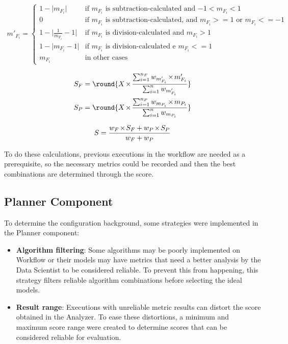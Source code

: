 \documentclass[10pt,conference]{IEEEtran}
\DeclarePairedDelimiter{\round}\lfloor\rceil
\let\oldtimes\times
\def\times{{\mkern1mu\oldtimes\mkern1mu}}
\begin{document}
\begin{gather}
\label{eqn:normalizationFairness}
	m'_{F_i} = 
	\begin{cases}
	1-\lvert m_{F_i} \rvert & \text{if $m_{F_i}$ is subtraction-calculated and $-1 < m_{F_i} < 1$}\\
	0 & \text{if $m_{F_i}$ is subtraction-calculated, and $m_{F_i} >= 1$ or $m_{F_i} <= -1$}\\
	1-\lvert \frac{1}{m_{F_i}}-1 \lvert & \text{if $m_{F_i}$ is division-calculated and $m_{F_i} > 1$}\\
	1-\lvert m_{F_i}-1 \lvert & \text{if $m_{F_i}$ is division-calculated e $m_{F_i} <= 1$}\\
	m_{F_i} & \text{in other cases}
	\end{cases}
\end{gather}

\begin{equation}
\label{eqn:groupScores}
	\begin{aligned}
	S_F = \round{X \times \frac{\sum_{i=1}^{n_F} w_{m'_{F_i}} \times m'_{F_i}}{\sum_{i=1}^{n} w_{m'_{F_i}}}}\\
	S_P = \round{X \times \frac{\sum_{i=1}^{n_P} w_{m_{P_i}} \times m_{P_i}}{\sum_{i=1}^{n} w_{m_{P_i}}}}
	\end{aligned}
\end{equation}

\begin{equation}
\label{eqn:totalScore}
	S = \frac{w_F \times S_F + w_P \times S_P}{w_F + w_P}
\end{equation}

To do these calculations, previous executions in the workflow are needed as a prerequisite, so the necessary metrics could be recorded and then the best combinations are determined through the score.

\subsection{Planner Component}

To determine the configuration background, some strategies were implemented in the Planner component:

\begin{itemize}
\item \textbf{Algorithm filtering}: Some algorithms may be poorly implemented on Workflow or their models may have metrics that need a better analysis by the Data Scientist to be considered reliable. To prevent this from happening, this strategy filters reliable algorithm combinations before selecting the ideal models.
\item \textbf{Result range}: Executions with unreliable metric results can distort the score obtained in the Analyzer. To ease these distortions, a minimum and maximum score range were created to determine scores that can be considered reliable for evaluation.
\end{itemize}
\end{document}

